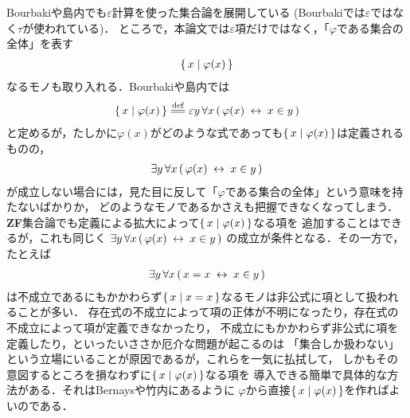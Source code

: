 	Bourbaki\cite{Bourbaki}や島内\cite{Shimauchi}でも$\varepsilon$計算を使った集合論を展開している
	(Bourbaki\cite{Bourbaki}では$\varepsilon$ではなく$\tau$が使われている)．
	ところで，本論文では$\varepsilon$項だけではなく，「$\varphi$である集合の全体」を表す
	\begin{align}
		\{\, x \mid \varphi(x)\, \}
	\end{align}
	なるモノも取り入れる．Bourbaki\cite{Bourbaki}や島内\cite{Shimauchi}では
	\begin{align}
		\Set{x}{\varphi(x)} \defeq \varepsilon y\, \forall x\, 
		(\, \varphi(x) \lrarrow x \in y\, )
	\end{align}
	と定めるが，たしかに$\varphi(x)$がどのような式であっても$\{\, x \mid \varphi(x)\, \}$は定義されるものの，
	\begin{align}
		\exists y\, \forall x\, (\, \varphi(x) \hspace{0.25em}\leftrightarrow\hspace{0.25em} x \in y\, )
	\end{align}
	が成立しない場合には，見た目に反して「$\varphi$である集合の全体」という意味を持たないばかりか，
	どのようなモノであるかさえも把握できなくなってしまう．
	{\bf ZF}集合論でも定義による拡大によって$\{\, x \mid \varphi(x)\, \}$なる項を
	追加することはできるが，これも同じく
	$\exists y\, \forall x\, (\, \varphi(x) \hspace{0.25em}\leftrightarrow\hspace{0.25em} x \in y\, )$
	の成立が条件となる．その一方で，たとえば%
	\begin{align}
		\exists y\, \forall x\, (\, x = x \hspace{0.25em}\leftrightarrow\hspace{0.25em} x \in y\, )
	\end{align}
	は不成立であるにもかかわらず$\{\, x \mid x = x\, \}$なるモノは非公式に項として扱われることが多い．
	存在式の不成立によって項の正体が不明になったり，存在式の不成立によって項が定義できなかったり，
	不成立にもかかわらず非公式に項を定義したり，といったいささか厄介な問題が起こるのは
	「集合しか扱わない」という立場にいることが原因であるが，これらを一気に払拭して，
	しかもその意図するところを損なわずに$\{\, x \mid \varphi(x)\, \}$なる項を
	導入できる簡単で具体的な方法がある．それはBernays\cite{Bernays}や竹内\cite{TakeuchiSet}にあるように
	$\varphi$から直接$\{\, x \mid \varphi(x)\, \}$を作ればよいのである．
	
